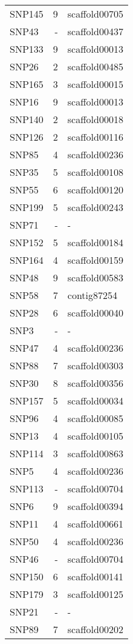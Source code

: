 \documentclass[smallextended]{svjour3}       %
\begin{document}
\begin{longtable}{lrl}
  SNP145 &   9 & scaffold00705 \\ 
  SNP43 & - & scaffold00437 \\ 
  SNP133 &   9 & scaffold00013 \\ 
  SNP26 &   2 & scaffold00485 \\ 
  SNP165 &   3 & scaffold00015 \\ 
  SNP16 &   9 & scaffold00013 \\ 
  SNP140 &   2 & scaffold00018 \\ 
  SNP126 &   2 & scaffold00116 \\ 
  SNP85 &   4 & scaffold00236 \\ 
  SNP35 &   5 & scaffold00108 \\ 
  SNP55 &   6 & scaffold00120 \\ 
  SNP199 &   5 & scaffold00243 \\ 
  SNP71 & - & - \\ 
  SNP152 &   5 & scaffold00184 \\ 
  SNP164 &   4 & scaffold00159 \\ 
  SNP48 &   9 & scaffold00583 \\ 
  SNP58 &   7 & contig87254 \\ 
  SNP28 &   6 & scaffold00040 \\ 
  SNP3 & - & - \\ 
  SNP47 &   4 & scaffold00236 \\ 
  SNP88 &   7 & scaffold00303 \\ 
  SNP30 &   8 & scaffold00356 \\ 
  SNP157 &   5 & scaffold00034 \\ 
  SNP96 &   4 & scaffold00085 \\ 
  SNP13 &   4 & scaffold00105 \\ 
  SNP114 &   3 & scaffold00863 \\ 
  SNP5 &   4 & scaffold00236 \\ 
  SNP113 & - & scaffold00704 \\ 
  SNP6 &   9 & scaffold00394 \\ 
  SNP11 &   4 & scaffold00661 \\ 
  SNP50 &   4 & scaffold00236 \\ 
  SNP46 & - & scaffold00704 \\ 
  SNP150 &   6 & scaffold00141 \\ 
  SNP179 &   3 & scaffold00125 \\ 
  SNP21 & - & - \\ 
  SNP89 &   7 & scaffold00202 \\ 

\end{longtable}
\end{document}
